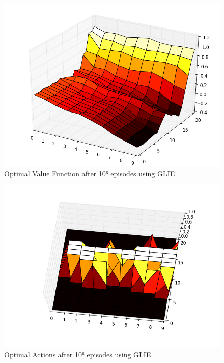 \documentclass[12pt,a4paper]{article}
\begin{document}
\begin{figure}[!ht]
   \caption{\label{E21_MC_V} Optimal Value Function after 10⁶ episodes using GLIE}
   \includegraphics[scale=0.4]{Easy21_Results/MC_value_1e6.png}
\end{figure}

\begin{figure}[!ht]
   \caption{\label{E21_MC_D} Optimal Actions after 10⁶ episodes using GLIE}
   \includegraphics[scale=0.4]{Easy21_Results/MC_decision_1e6.png}
\end{figure}
\end{document}
